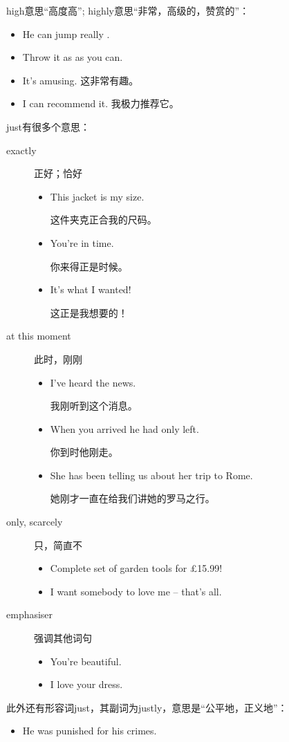 high意思“高度高”; highly意思“非常，高级的，赞赏的”：
\begin{itemize}
\item He can jump really .
\item Throw it as  as you can.
\item It's  amusing. 这非常有趣。
\item I can  recommend it. 我极力推荐它。
\end{itemize}

just有很多个意思：
\begin{description}
\item[exactly] 正好；恰好
  \begin{itemize}
  \item This jacket is  my size.

    这件夹克正合我的尺码。

  \item You're  in time.

    你来得正是时候。

  \item It's  what I wanted!

    这正是我想要的！
  \end{itemize}

\item[at this moment] 此时，刚刚
  \begin{itemize}
  \item I've  heard the news.

    我刚听到这个消息。

  \item When you arrived he had only  left.

    你到时他刚走。
  \item She has  been telling us about her trip to Rome.

    她刚才一直在给我们讲她的罗马之行。
  \end{itemize}

\item[only, scarcely] 只，简直不
  \begin{itemize}
  \item Complete set of garden tools for  £15.99!
  \item I  want somebody to love me – that's all.
  \end{itemize}

\item[emphasiser] 强调其他词句
  \begin{itemize}
  \item You're  beautiful.

  \item I  love your dress.
  \end{itemize}
\end{description}
此外还有形容词just，其副词为justly，意思是“公平地，正义地”：
\begin{itemize}
\item He was  punished for his crimes.
\end{itemize}


